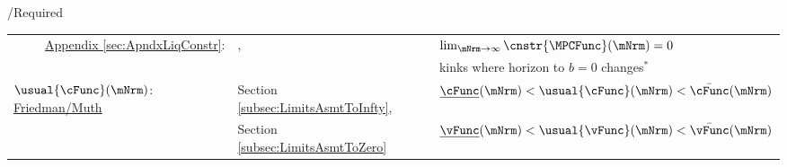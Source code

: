 \documentclass[\econtexRoot/BufferStockTheory]{subfiles}
\providecommand{\TblName}{}
\renewcommand{\TblName}{Required}
\begin{document}
\begin{verbatimwrite}{\TableDir/\TblName}
\begin{table}
{\begin{tabular}{|l|l|l|}
        \\ \cline{2-3}\multicolumn{1}{|r|}{\href{https://\owner.github.io/BufferStockTheory\#ApndxLiqConstr}{Appendix \ref{sec:ApndxLiqConstr}}:}  & \GICRaw,\cncl{\RIC}                     & $\lim_{\mNrm \rightarrow \infty}  \cnstr{\MPCFunc}(\mNrm)=0$
        \\                                                                                                                        &                                         & kinks where horizon to $b=0$ changes$^{\ast}$
        \\ \hline\hline \multicolumn{1}{|l|}{$\usual{\cFunc}(\mNrm)$:  \href{https://\owner.github.io/BufferStockTheory\#Uncertainty-Modified-Conditions}{Friedman/Muth}
        }                                                                                                                       & Section \ref{subsec:LimitsAsmtToInfty}, & $\underline{\cFunc}(\mNrm) < \usual{\cFunc}(\mNrm) < \bar{\cFunc}(\mNrm)$ %
        \\                                                                                                                      & Section \ref{subsec:LimitsAsmtToZero}   & $\underline{\vFunc}(\mNrm) < \usual{\vFunc}(\mNrm) < \bar{\vFunc}(\mNrm)$ %
                                                                                                                                                                       

\end{tabular}}
\end{table}
\end{verbatimwrite}
\end{document}
